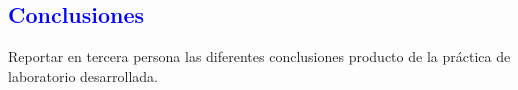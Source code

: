 \textcolor{blue}{\section{Conclusiones}}
Reportar en tercera persona las diferentes conclusiones producto de la práctica de laboratorio desarrollada.
